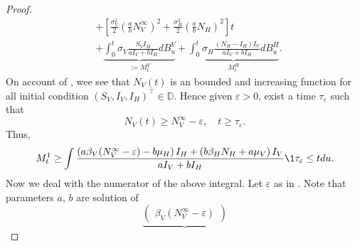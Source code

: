 \begin{proof}
\begin{equation}
\begin{aligned}
                & +
                \left[
                    \frac{\sigma_V ^ 2}{2}
                    \left(
                        \frac{a}{b} N_V ^ \infty
                    \right) ^2
                    +
                    \frac{\sigma_H ^ 2}{2}
                    \left(
                        \frac{a}{b}
                        N_H
                    \right) ^ 2
                \right]
                t
                \\
                &
                +
                \underbrace{
                    \int_{0} ^ t
                        \sigma_V
                        \frac{S_V I_H}{a I_V + b I_H}
                    d B_u ^ V
                }_{:= M_t ^ V}
                +
                \underbrace{
                    \int_{0} ^ t
                        \sigma_H 
                        \frac{(N_H - I_H) I_V}{a I_V + b I_H}
                    d B_u ^ H 
                }_{M_t ^ H}.
        \end{aligned}
    \end{equation}
    On account of , wee see that $N_V(t)$ is an
    bounded and increasing function for all initial condition
    ${(S_V, I_V, I_H)^ \top  \in \mathbb{D}}$. Hence given $\varepsilon >0$, 
    exist
    a time $\tau_\varepsilon$ such that
    $$
        N_V(t) \geq N_V ^ \infty 
        -
        \varepsilon, \quad t\geq \tau_\varepsilon.
    $$
    Thus,
    \begin{equation} \label{eqn:tau_bound}
        M_t ^ 1 \geq 
            \int
                \frac{
                    \left(
                        a \beta_V (N_V ^ \infty - \varepsilon) - b \mu_H
                    \right) I_H
                    +
                    \left(
                        b \beta_H N_H + a \mu_V
                    \right) I_V
                }{a I_V + bI_H}
                \1{\tau_\varepsilon \leq t}
                du .
    \end{equation}
    Now we deal with the numerator of the above integral. Let $\varepsilon$
    as in . Note that
    parameters $a$, $b$ are solution of
    \begin{equation*}
        \underbrace{
            \begin{pmatrix}
                \beta_V \left(N_V ^ {\infty} -\varepsilon\right)

\end{pmatrix}}
\end{equation*}
\end{proof}
